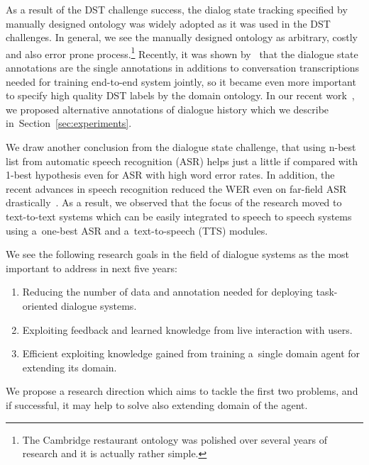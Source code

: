\documentclass[11pt]{article}
\begin{document}
As a result of the DST challenge success, the dialog state tracking specified by manually designed ontology was widely adopted as it was used in the DST challenges.
In general, we see the manually designed ontology as arbitrary, costly and also error prone process.\footnote{The Cambridge restaurant ontology was polished over several years of research and it is actually rather simple.}
Recently, it was shown by~\cite{wen_networkbased_2016} that the dialogue state annotations are the single annotations in additions to conversation transcriptions needed for training end-to-end system jointly, so it became even more important to specify high quality DST labels by the domain ontology.
In our recent work~\cite{platek2016wochat}, we proposed alternative annotations of dialogue history which we describe in~Section~\ref{sec:experiments}.

We draw another conclusion from the dialogue state challenge, that using n-best list from automatic speech recognition (ASR) helps just a little if compared with 1-best hypothesis even for ASR with high word error rates.
In addition, the recent advances in speech recognition reduced the WER even on far-field ASR drastically~\cite{peddinti_jhu_2015,zhang_highway_2016}.
As a result, we observed that the focus of the research moved to text-to-text systems which can be easily integrated to speech to speech systems using a~one-best ASR and a~text-to-speech (TTS) modules.

We see the following research goals in the field of dialogue systems as the most important to address in next five years:
\begin{enumerate}
    \item Reducing the number of data and annotation needed for deploying task-oriented dialogue systems.
    \item Exploiting feedback and learned knowledge from live interaction with users.
    \item Efficient exploiting knowledge gained from training a~single domain agent for extending its domain. 
\end{enumerate}


We propose a research direction which aims to tackle the first two problems, and if successful, it may help to solve also extending domain of the agent.
\end{document}
